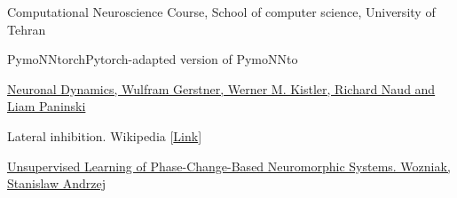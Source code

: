 \begin{thebibliography}{1}
        \begin{latin}
            Computational Neuroscience Course, School of computer science, University of Tehran
        \end{latin}
        \begin{latin}
            PymoNNtorchPytorch-adapted version of PymoNNto
        \end{latin}
        \begin{latin}
            \href{https://neuronaldynamics.epfl.ch/online/Ch12.S3.html}{Neuronal Dynamics, Wulfram Gerstner, Werner M. Kistler, Richard Naud and Liam Paninski
            }
        \end{latin}
        \begin{latin}
            Lateral inhibition. Wikipedia
            [\href{https://en.wikipedia.org/wiki/Lateral_inhibition}{Link}]
        \end{latin}
        \begin{latin}
            \href{https://infoscience.epfl.ch/record/232675?v=pdf}{Unsupervised Learning of Phase-Change-Based Neuromorphic Systems. Wozniak, Stanislaw Andrzej
            }
        \end{latin}
    \end{thebibliography}